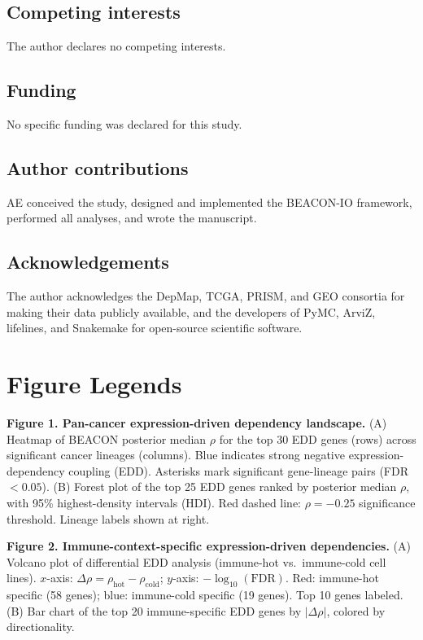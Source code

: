 \documentclass[12pt]{article}
\begin{document}
\subsection*{Competing interests}
The author declares no competing interests.

\subsection*{Funding}
No specific funding was declared for this study.

\subsection*{Author contributions}
AE conceived the study, designed and implemented the BEACON-IO framework, performed all analyses, and wrote the manuscript.

\subsection*{Acknowledgements}
The author acknowledges the DepMap, TCGA, PRISM, and GEO consortia for making their data publicly available, and the developers of PyMC, ArviZ, lifelines, and Snakemake for open-source scientific software.




\clearpage

\section*{Figure Legends}

\textbf{Figure 1. Pan-cancer expression-driven dependency landscape.}
(A) Heatmap of BEACON posterior median $\rho$ for the top 30 EDD genes (rows) across significant cancer lineages (columns). Blue indicates strong negative expression-dependency coupling (EDD). Asterisks mark significant gene-lineage pairs (FDR $< 0.05$). (B) Forest plot of the top 25 EDD genes ranked by posterior median $\rho$, with 95\% highest-density intervals (HDI). Red dashed line: $\rho = -0.25$ significance threshold. Lineage labels shown at right.

\textbf{Figure 2. Immune-context-specific expression-driven dependencies.}
(A) Volcano plot of differential EDD analysis (immune-hot vs.\ immune-cold cell lines). $x$-axis: $\Delta\rho = \rho_\text{hot} - \rho_\text{cold}$; $y$-axis: $-\log_{10}(\text{FDR})$. Red: immune-hot specific (58 genes); blue: immune-cold specific (19 genes). Top 10 genes labeled. (B) Bar chart of the top 20 immune-specific EDD genes by $|\Delta\rho|$, colored by directionality.
\end{document}
